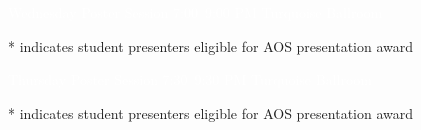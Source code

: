 \documentclass[twoside]{article}
\begin{document}

\thispagestyle{empty}
\pagestyle{fancy}

\setlength{\parindent}{0cm}

\newcommand\posterentry[3]{%
	\begin{minipage}{\linewidth}
	#1 \textbf{#2} \\ #3 \\
	\end{minipage}
}

\begin{shaded}
\Huge{\textcolor{white}{Wednesday Poster Session \normalsize 7:00--9:00 PM Turquoise Ballroom}}
\end{shaded}

* indicates student presenters eligible for AOS presentation award
 
\begin{multicols}{2}

\normalsize


\end{multicols}

\newpage

\begin{shaded}
\Huge{\textcolor{white}{Thursday Poster Session \normalsize 7:30--9:30 PM Turquoise Ballroom}}
\end{shaded}

* indicates student presenters eligible for AOS presentation award

\begin{multicols}{2}

\normalsize


\end{multicols}

%
\end{document}
